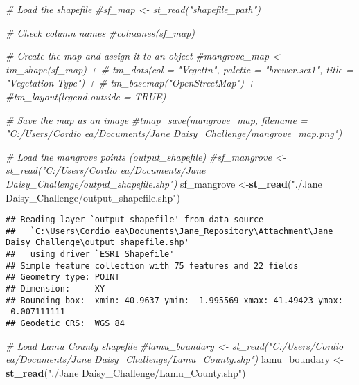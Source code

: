 \documentclass[
]{article}
\newenvironment{Shaded}{\begin{snugshade}}{\end{snugshade}}
\newcommand{\CommentTok}[1]{\textcolor[rgb]{0.56,0.35,0.01}{\textit{#1}}}
\newcommand{\FunctionTok}[1]{\textcolor[rgb]{0.13,0.29,0.53}{\textbf{#1}}}
\newcommand{\NormalTok}[1]{#1}
\newcommand{\OtherTok}[1]{\textcolor[rgb]{0.56,0.35,0.01}{#1}}
\newcommand{\StringTok}[1]{\textcolor[rgb]{0.31,0.60,0.02}{#1}}
\begin{document}
\begin{Shaded}
\begin{Highlighting}[]
\CommentTok{\# Load the shapefile}
\CommentTok{\#sf\_map \textless{}{-} st\_read("shapefile\_path")}

\CommentTok{\# Check column names}
\CommentTok{\#colnames(sf\_map)}

\CommentTok{\# Create the map and assign it to an object}
\CommentTok{\#mangrove\_map \textless{}{-} tm\_shape(sf\_map) + }
 \CommentTok{\# tm\_dots(col = "Vegettn", palette = "brewer.set1", title = "Vegetation Type") + }
 \CommentTok{\# tm\_basemap("OpenStreetMap") + }
  \CommentTok{\#tm\_layout(legend.outside = TRUE)}

\CommentTok{\# Save the map as an image}
\CommentTok{\#tmap\_save(mangrove\_map, filename = "C:/Users/Cordio ea/Documents/Jane Daisy\_Challenge/mangrove\_map.png")}
\end{Highlighting}
\end{Shaded}

\begin{Shaded}
\begin{Highlighting}[]
\CommentTok{\# Load the mangrove points (output\_shapefile)}
\CommentTok{\#sf\_mangrove \textless{}{-} st\_read("C:/Users/Cordio ea/Documents/Jane Daisy\_Challenge/output\_shapefile.shp")}
\NormalTok{sf\_mangrove }\OtherTok{\textless{}{-}}\FunctionTok{st\_read}\NormalTok{(}\StringTok{"./Jane Daisy\_Challenge/output\_shapefile.shp"}\NormalTok{)}
\end{Highlighting}
\end{Shaded}

\begin{verbatim}
## Reading layer `output_shapefile' from data source 
##   `C:\Users\Cordio ea\Documents\Jane_Repository\Attachment\Jane Daisy_Challenge\output_shapefile.shp' 
##   using driver `ESRI Shapefile'
## Simple feature collection with 75 features and 22 fields
## Geometry type: POINT
## Dimension:     XY
## Bounding box:  xmin: 40.9637 ymin: -1.995569 xmax: 41.49423 ymax: -0.007111111
## Geodetic CRS:  WGS 84
\end{verbatim}

\begin{Shaded}
\begin{Highlighting}[]
\CommentTok{\# Load Lamu County shapefile}
\CommentTok{\#lamu\_boundary \textless{}{-} st\_read("C:/Users/Cordio ea/Documents/Jane Daisy\_Challenge/Lamu\_County.shp")}
\NormalTok{lamu\_boundary }\OtherTok{\textless{}{-}} \FunctionTok{st\_read}\NormalTok{(}\StringTok{"./Jane Daisy\_Challenge/Lamu\_County.shp"}\NormalTok{)}
\end{Highlighting}
\end{Shaded}
\end{document}
